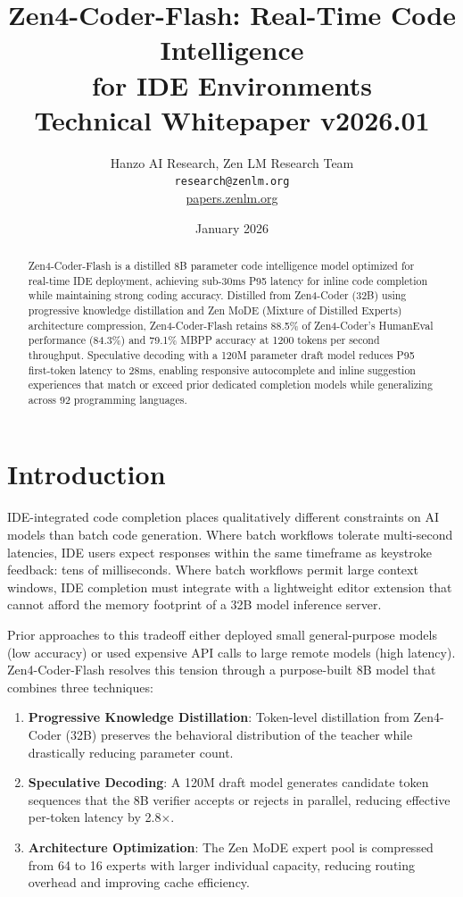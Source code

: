 \documentclass[11pt,a4paper]{article}
\title{\textbf{Zen4-Coder-Flash: Real-Time Code Intelligence\\
for IDE Environments}\\[0.5em]
\large Technical Whitepaper v2026.01}
\author{Hanzo AI Research, Zen LM Research Team\\
\texttt{research@zenlm.org}\\
\href{https://papers.zenlm.org}{papers.zenlm.org}}
\date{January 2026}
\begin{document}
\maketitle

\begin{abstract}
Zen4-Coder-Flash is a distilled 8B parameter code intelligence model optimized for real-time IDE deployment, achieving sub-30ms P95 latency for inline code completion while maintaining strong coding accuracy. Distilled from Zen4-Coder (32B) using progressive knowledge distillation and Zen MoDE (Mixture of Distilled Experts) architecture compression, Zen4-Coder-Flash retains 88.5\% of Zen4-Coder's HumanEval performance (84.3\%) and 79.1\% MBPP accuracy at 1200 tokens per second throughput. Speculative decoding with a 120M parameter draft model reduces P95 first-token latency to 28ms, enabling responsive autocomplete and inline suggestion experiences that match or exceed prior dedicated completion models while generalizing across 92 programming languages.
\end{abstract}

\tableofcontents
\newpage

\section{Introduction}

IDE-integrated code completion places qualitatively different constraints on AI models than batch code generation. Where batch workflows tolerate multi-second latencies, IDE users expect responses within the same timeframe as keystroke feedback: tens of milliseconds. Where batch workflows permit large context windows, IDE completion must integrate with a lightweight editor extension that cannot afford the memory footprint of a 32B model inference server.

Prior approaches to this tradeoff either deployed small general-purpose models (low accuracy) or used expensive API calls to large remote models (high latency). Zen4-Coder-Flash resolves this tension through a purpose-built 8B model that combines three techniques:

\begin{enumerate}
  \item \textbf{Progressive Knowledge Distillation}: Token-level distillation from Zen4-Coder (32B) preserves the behavioral distribution of the teacher while drastically reducing parameter count.
  \item \textbf{Speculative Decoding}: A 120M draft model generates candidate token sequences that the 8B verifier accepts or rejects in parallel, reducing effective per-token latency by 2.8$\times$.
  \item \textbf{Architecture Optimization}: The Zen MoDE expert pool is compressed from 64 to 16 experts with larger individual capacity, reducing routing overhead and improving cache efficiency.
\end{enumerate}
\end{document}
